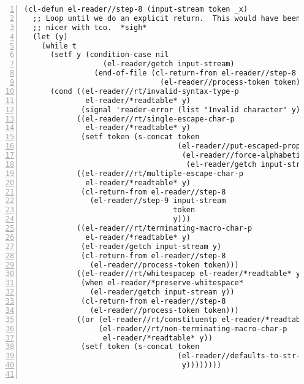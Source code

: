 \documentclass[a4paper,10pt,twoside]{report}
\begin{document}
\begin{lstlisting}[style=lispcode,label={code:read-algo},caption={Code for the
    reader algorithm.},numbers=left]
(cl-defun el-reader//step-8 (input-stream token _x)
  ;; Loop until we do an explicit return.  This would have been so much
  ;; nicer with tco.  *sigh*
  (let (y)
    (while t
      (setf y (condition-case nil
                  (el-reader/getch input-stream)
                (end-of-file (cl-return-from el-reader//step-8
                               (el-reader//process-token token)))))
      (cond ((el-reader//rt/invalid-syntax-type-p
              el-reader/*readtable* y)
             (signal 'reader-error (list "Invalid character" y)))
            ((el-reader//rt/single-escape-char-p
              el-reader/*readtable* y)
             (setf token (s-concat token
                                   (el-reader//put-escaped-prop
                                    (el-reader//force-alphabetic
                                     (el-reader/getch input-stream))))))
            ((el-reader//rt/multiple-escape-char-p
              el-reader/*readtable* y)
             (cl-return-from el-reader//step-8
               (el-reader//step-9 input-stream
                                  token
                                  y)))
            ((el-reader//rt/terminating-macro-char-p
              el-reader/*readtable* y)
             (el-reader/getch input-stream y)
             (cl-return-from el-reader//step-8
               (el-reader//process-token token)))
            ((el-reader//rt/whitespacep el-reader/*readtable* y)
             (when el-reader/*preserve-whitespace*
               (el-reader/getch input-stream y))
             (cl-return-from el-reader//step-8
               (el-reader//process-token token)))
            ((or (el-reader//rt/constituentp el-reader/*readtable* y)
                 (el-reader//rt/non-terminating-macro-char-p
                  el-reader/*readtable* y))
             (setf token (s-concat token
                                   (el-reader//defaults-to-str-props
                                    y))))))))


\end{lstlisting}
\end{document}
